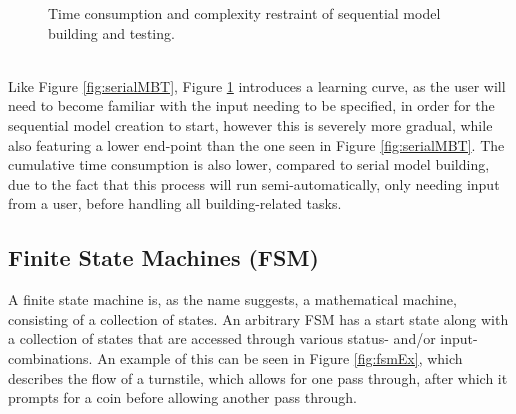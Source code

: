 \begin{description}
\begin{figure}[h]
		\caption{Time consumption and complexity restraint of sequential model building and testing.}
		\label{fig:sequenceMBT}
	\end{figure}\\
	Like Figure \ref{fig:serialMBT}, Figure \ref{fig:sequenceMBT} introduces a learning curve, as the user will need to become familiar with the input needing to be specified, in order for the sequential model creation to start, however this is severely more gradual, while also featuring a lower end-point than the one seen in Figure \ref{fig:serialMBT}. The cumulative time consumption is also lower, compared to serial model building, due to the fact that this process will run semi-automatically, only needing input from a user, before handling all building-related tasks.
\end{description}
\newpage
\subsection{Finite State Machines (FSM)}
A finite state machine is, as the name suggests, a mathematical machine, consisting of a collection of states. An arbitrary FSM has a start state along with a collection of states that are accessed through various status- and/or input-combinations. An example of this can be seen in Figure \ref{fig:fsmEx}, which describes the flow of a turnstile, which allows for one pass through, after which it prompts for a coin before allowing another pass through.


